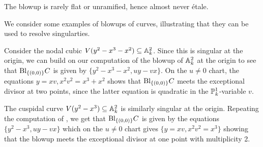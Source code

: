 \begin{remark}
    The blowup is rarely flat or unramified, hence almost never \'{e}tale. 
\end{remark}
We consider some examples of blowups of curves, illustrating that they can be used to resolve singularties. 
\begin{example}\label{ex: blowup of node}
    Consider the nodal cubic $V(y^{2}-x^{3}-x^{2})\subseteq\mathbb{A}^{2}_{k}$. Since this is singular at the origin, we can build on our computation of the blowup of $\mathbb{A}^{2}_{k}$ at the origin  to see that $\mathrm{Bl}_{\{(0,0)\}}C$ is given by $\{y^{2}-x^{3}-x^{2},uy-vx\}$. On the $u\neq0$ chart, the equations $y=xv,x^{2}v^{2}=x^{3}+x^{2}$ shows that $\mathrm{Bl}_{\{(0,0)\}}C$ meets the exceptional divisor at two points, since the latter equation is quadratic in the $\mathbb{P}^{1}_{k}$-variable $v$. 
\end{example}
\begin{example}
    The cuspidal curve $V(y^{2}-x^{3})\subseteq\mathbb{A}^{2}_{k}$ is similarly singular at the origin. Repeating the computation of , we get that $\mathrm{Bl}_{\{(0,0)\}}C$ is given by the equations $\{y^{2}-x^{3},uy-vx\}$ which on the $u\neq0$ chart gives $\{y=xv,x^{2}v^{2}=x^{3}\}$ showing that the blowup meets the exceptional divisor at one point with multiplicity 2. 
\end{example}